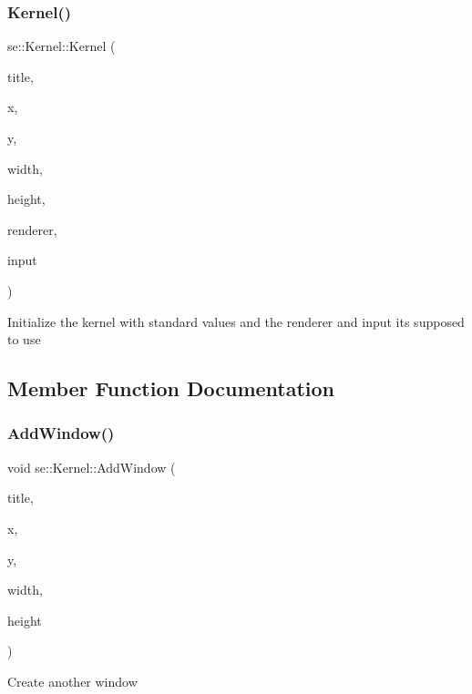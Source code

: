 \subsubsection{\texorpdfstring{Kernel()}{Kernel()}}
{\footnotesize\ttfamily se\+::\+Kernel\+::\+Kernel (\begin{DoxyParamCaption}\item[{const std\+::string \&}]{title,  }\item[{int}]{x,  }\item[{int}]{y,  }\item[{int}]{width,  }\item[{int}]{height,  }\item[{\mbox{\hyperlink{classse_1_1_abstract_renderer}{Abstract\+Renderer}} $\ast$}]{renderer,  }\item[{\mbox{\hyperlink{classse_1_1_input}{Input}} $\ast$}]{input }\end{DoxyParamCaption})}

Initialize the kernel with standard values and the renderer and input it\textquotesingle{}s supposed to use 

\subsection{Member Function Documentation}
\mbox{\label{classse_1_1_kernel_aa65f624076feaa97a95901077df35357}} 
\subsubsection{\texorpdfstring{Add\+Window()}{AddWindow()}}
{\footnotesize\ttfamily void se\+::\+Kernel\+::\+Add\+Window (\begin{DoxyParamCaption}\item[{const std\+::string \&}]{title,  }\item[{int}]{x,  }\item[{int}]{y,  }\item[{int}]{width,  }\item[{int}]{height }\end{DoxyParamCaption})}

Create another window \mbox{\label{classse_1_1_kernel_a1faeac6fce02ccd7ff76d94ad78e0754}} 
